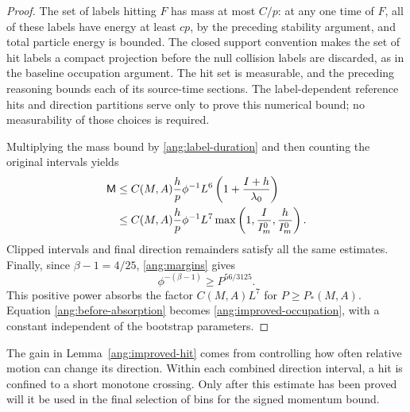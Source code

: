\begin{proof}
The set of labels hitting $F$ has mass at most $C/p$: at any one time
of $F$, all of these labels have energy at least $cp$, by the preceding
stability argument, and total particle energy is bounded. The closed
support convention makes the set of hit labels a compact projection
before the null collision labels are discarded,
as in the baseline occupation argument. The hit set is measurable,
and the preceding reasoning bounds each of its
source-time sections. The label-dependent reference hits and direction
partitions serve only to prove this numerical bound; no measurability
of those choices is required.

Multiplying the mass bound by \eqref{ang:label-duration} and then
counting the original intervals yields
\begin{align}
 \mathsf M
 &\le C(M,A)\frac hp\phi^{-1}L^6
                   \left(1+\frac{I+h}{\lambda_0}\right)\notag\\
 &\le C(M,A)\frac hp\phi^{-1}L^7
                   \max\left(1,\frac I{I_m^0},\frac h{I_m^0}\right).
                                                        \label{ang:before-absorption}
\end{align}
Clipped intervals and final direction remainders satisfy all the same
estimates. Finally, since $\beta-1=4/25$, \eqref{ang:margins} gives
\[
 \phi^{-(\beta-1)}\ge P^{56/3125}.
\]
This positive power absorbs the factor $C(M,A)L^7$ for
$P\ge P_*(M,A)$. Equation \eqref{ang:before-absorption} becomes
\eqref{ang:improved-occupation}, with a constant independent of the
bootstrap parameters.
\end{proof}

The gain in Lemma~\ref{ang:improved-hit} comes from controlling how often
relative motion can change its direction. Within each combined direction
interval, a hit is confined to a short monotone crossing. Only after
this estimate has been proved will it be used in the final selection of
bins for the signed momentum bound.
